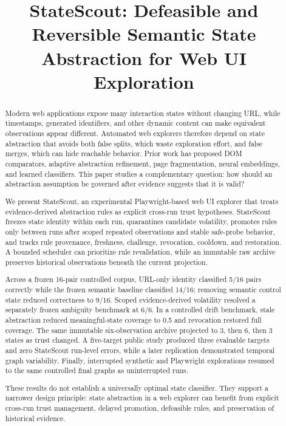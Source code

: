 \documentclass[conference]{IEEEtran}
\title{StateScout: Defeasible and Reversible Semantic State Abstraction for Web UI Exploration}
\author{\IEEEauthorblockN{Anonymous Author(s)}
\IEEEauthorblockA{Double-anonymous submission}}
\begin{document}
\maketitle

\begin{abstract}
Modern web applications expose many interaction states without changing URL, while timestamps, generated identifiers, and other dynamic content can make equivalent observations appear different. Automated web explorers therefore depend on state abstraction that avoids both false splits, which waste exploration effort, and false merges, which can hide reachable behavior. Prior work has proposed DOM comparators, adaptive abstraction refinement, page fragmentation, neural embeddings, and learned classifiers. This paper studies a complementary question: how should an abstraction assumption be governed after evidence suggests that it is valid?

We present StateScout, an experimental Playwright-based web UI explorer that treats evidence-derived abstraction rules as explicit cross-run trust hypotheses. StateScout freezes state identity within each run, quarantines candidate volatility, promotes rules only between runs after scoped repeated observations and stable safe-probe behavior, and tracks rule provenance, freshness, challenge, revocation, cooldown, and restoration. A bounded scheduler can prioritize rule revalidation, while an immutable raw archive preserves historical observations beneath the current projection.

Across a frozen 16-pair controlled corpus, URL-only identity classified 5/16 pairs correctly while the frozen semantic baseline classified 14/16; removing semantic control state reduced correctness to 9/16. Scoped evidence-derived volatility resolved a separately frozen ambiguity benchmark at 6/6. In a controlled drift benchmark, stale abstraction reduced meaningful-state coverage to 0.5 and revocation restored full coverage. The same immutable six-observation archive projected to 3, then 6, then 3 states as trust changed. A five-target public study produced three evaluable targets and zero StateScout run-level errors, while a later replication demonstrated temporal graph variability. Finally, interrupted synthetic and Playwright explorations resumed to the same controlled final graphs as uninterrupted runs.

These results do not establish a universally optimal state classifier. They support a narrower design principle: state abstraction in a web explorer can benefit from explicit cross-run trust management, delayed promotion, defeasible rules, and preservation of historical evidence.
\end{abstract}
\end{document}
